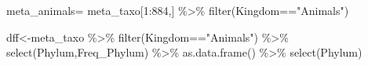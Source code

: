 \documentclass[
  letterpaper,
  DIV=11,
  numbers=noendperiod]{scrreprt}
\newenvironment{Shaded}{}{}
\newcommand{\DecValTok}[1]{\textcolor[rgb]{0.82,0.60,0.40}{#1}}
\newcommand{\FunctionTok}[1]{\textcolor[rgb]{0.38,0.69,0.94}{#1}}
\newcommand{\NormalTok}[1]{\textcolor[rgb]{0.67,0.70,0.75}{#1}}
\newcommand{\OtherTok}[1]{\textcolor[rgb]{0.15,0.68,0.38}{#1}}
\newcommand{\SpecialCharTok}[1]{\textcolor[rgb]{0.34,0.71,0.76}{#1}}
\newcommand{\StringTok}[1]{\textcolor[rgb]{0.60,0.76,0.47}{#1}}
\begin{document}
\begin{Shaded}
\begin{Highlighting}[]
\NormalTok{meta\_animals}\OtherTok{=}\NormalTok{ meta\_taxo[}\DecValTok{1}\SpecialCharTok{:}\DecValTok{884}\NormalTok{,] }\SpecialCharTok{\%\textgreater{}\%} \FunctionTok{filter}\NormalTok{(Kingdom}\SpecialCharTok{==}\StringTok{"Animals"}\NormalTok{)}

\NormalTok{dff}\OtherTok{\textless{}{-}}\NormalTok{meta\_taxo }\SpecialCharTok{\%\textgreater{}\%}
  \FunctionTok{filter}\NormalTok{(Kingdom}\SpecialCharTok{==}\StringTok{"Animals"}\NormalTok{) }\SpecialCharTok{\%\textgreater{}\%} 
  \FunctionTok{select}\NormalTok{(Phylum,Freq\_Phylum) }\SpecialCharTok{\%\textgreater{}\%}   
  \FunctionTok{as.data.frame}\NormalTok{() }\SpecialCharTok{\%\textgreater{}\%} \FunctionTok{select}\NormalTok{(Phylum)}


\end{Highlighting}
\end{Shaded}
\end{document}
